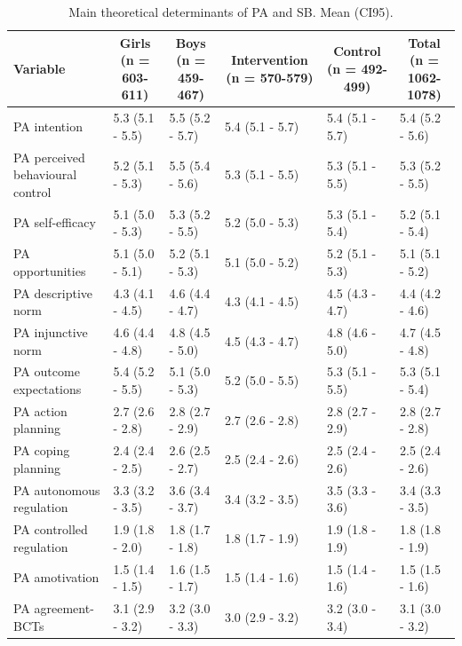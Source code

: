 \documentclass[english,man,floatsintext]{apa6}
\begin{document}
\begin{table}[tbp]
\begin{center}
\begin{threeparttable}
\caption{\label{tab:mediator-table}Main theoretical determinants of PA and SB. Mean (CI95).}
\begin{tabular}{llllll}
\toprule
Variable  & \multicolumn{1}{c}{Girls (n = 603-611)} & \multicolumn{1}{c}{Boys (n = 459-467)} & \multicolumn{1}{c}{Intervention (n = 570-579)} & \multicolumn{1}{c}{Control (n = 492-499)} & \multicolumn{1}{c}{Total (n = 1062-1078)}\\
\midrule
PA intention & 5.3 (5.1 - 5.5) & 5.5 (5.2 - 5.7) & 5.4 (5.1 - 5.7) & 5.4 (5.1 - 5.7) & 5.4 (5.2 - 5.6)\\
PA perceived behavioural control & 5.2 (5.1 - 5.3) & 5.5 (5.4 - 5.6) & 5.3 (5.1 - 5.5) & 5.3 (5.1 - 5.5) & 5.3 (5.2 - 5.5)\\
PA self-efficacy & 5.1 (5.0 - 5.3) & 5.3 (5.2 - 5.5) & 5.2 (5.0 - 5.3) & 5.3 (5.1 - 5.4) & 5.2 (5.1 - 5.4)\\
PA opportunities & 5.1 (5.0 - 5.1) & 5.2 (5.1 - 5.3) & 5.1 (5.0 - 5.2) & 5.2 (5.1 - 5.3) & 5.1 (5.1 - 5.2)\\
PA descriptive norm & 4.3 (4.1 - 4.5) & 4.6 (4.4 - 4.7) & 4.3 (4.1 - 4.5) & 4.5 (4.3 - 4.7) & 4.4 (4.2 - 4.6)\\
PA injunctive norm & 4.6 (4.4 - 4.8) & 4.8 (4.5 - 5.0) & 4.5 (4.3 - 4.7) & 4.8 (4.6 - 5.0) & 4.7 (4.5 - 4.8)\\
PA outcome expectations & 5.4 (5.2 - 5.5) & 5.1 (5.0 - 5.3) & 5.2 (5.0 - 5.5) & 5.3 (5.1 - 5.5) & 5.3 (5.1 - 5.4)\\
PA action planning & 2.7 (2.6 - 2.8) & 2.8 (2.7 - 2.9) & 2.7 (2.6 - 2.8) & 2.8 (2.7 - 2.9) & 2.8 (2.7 - 2.8)\\
PA coping planning & 2.4 (2.4 - 2.5) & 2.6 (2.5 - 2.7) & 2.5 (2.4 - 2.6) & 2.5 (2.4 - 2.6) & 2.5 (2.4 - 2.6)\\
PA autonomous regulation & 3.3 (3.2 - 3.5) & 3.6 (3.4 - 3.7) & 3.4 (3.2 - 3.5) & 3.5 (3.3 - 3.6) & 3.4 (3.3 - 3.5)\\
PA controlled regulation & 1.9 (1.8 - 2.0) & 1.8 (1.7 - 1.8) & 1.8 (1.7 - 1.9) & 1.9 (1.8 - 1.9) & 1.8 (1.8 - 1.9)\\
PA amotivation & 1.5 (1.4 - 1.5) & 1.6 (1.5 - 1.7) & 1.5 (1.4 - 1.6) & 1.5 (1.4 - 1.6) & 1.5 (1.5 - 1.6)\\
PA agreement-BCTs & 3.1 (2.9 - 3.2) & 3.2 (3.0 - 3.3) & 3.0 (2.9 - 3.2) & 3.2 (3.0 - 3.4) & 3.1 (3.0 - 3.2)\\

\end{tabular}
\end{threeparttable}
\end{center}
\end{table}
\end{document}
